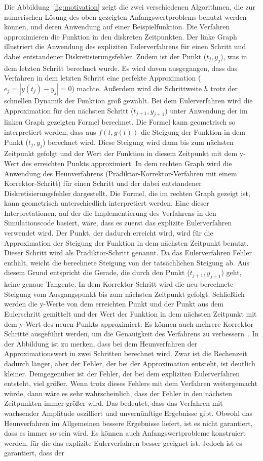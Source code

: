 \documentclass{listhesis}
\begin{document}
Die Abbildung~\ref{fig:motivation} zeigt die zwei verschiedenen Algorithmen, die zur numerischen Lösung des oben gezeigten Anfangswertproblems benutzt werden können, und deren Anwendung auf einer Beispielfunktion. Die Verfahren approximieren die Funktion in den diskreten Zeitpunkten. Der linke Graph illustriert die Anwendung des expliziten Eulerverfahrens für einen Schritt und dabei entstandener Diskretisierungsfehler. Zudem ist der Punkt ($t_j,y_j$), was in dem letzten Schritt berechnet wurde. Es wird davon ausgegangen, dass das Verfahren in dem letzten Schritt eine perfekte Approximation ($e_j = |y(t_j) - y_j| = 0$) machte. Außerdem wird die Schrittweite $h$ trotz der schnellen Dynamik der Funktion groß gewählt. Bei dem Eulerverfahren wird die Approximation für den nächsten Schritt ($t_{j+1}, y_{j+1}$) unter Anwendung der im linken Graph gezeigten Formel berechnet. Die Formel kann geometrisch so interpretiert werden, dass aus $f(t,y(t))$ die Steigung der Funktion in dem Punkt ($t_j, y_j$) berechnet wird. Diese Steigung wird dann bis zum nächsten Zeitpunkt gefolgt und der Wert der Funktion in diesem Zeitpunkt mit dem y-Wert des erreichten Punkts approximiert. In dem rechten Graph wird die Anwendung des Heunverfahrens (Prädiktor-Korrektor-Verfahren mit einem Korrektor-Schritt) für einen Schritt und der dabei entstandener Diskretisierungsfehler dargestellt. Die Formel, die im rechten Graph gezeigt ist, kann geometrisch unterschiedlich interpretiert werden. Eine dieser Interpretationen, auf der die Implementierung des Verfahrens in den Simulationscode basiert, wäre, dass es zuerst das explizite Eulerverfahren verwendet wird. Der Punkt, der dadurch erreicht wird, wird für die Approximation der Steigung der Funktion in dem nächsten Zeitpunkt benutzt. Dieser Schritt wird als Prädiktor-Schritt genannt. Da das Eulerverfahren Fehler enthält, weicht die berechnete Steigung von der tatsächlichen Steigung ab. Aus diesem Grund entspricht die Gerade, die durch den Punkt ($t_{j+1},y_{j+1}$) geht, keine genaue Tangente. In dem Korrektor-Schritt wird die neu berechnete Steigung vom Ausgangspunkt bis zum nächsten Zeitpunkt gefolgt. Schließlich werden die y-Werte von dem erreichten Punkt und der Punkt aus dem Eulerschritt gemittelt und der Wert der Funktion in dem nächsten Zeitpunkt mit dem y-Wert des neuen Punkts approximiert. Es können auch mehrere Korrektor-Schritte ausgeführt werden, um die Genauigkeit des Verfahrens zu verbessern~\cite{butcher}. In der Abbildung ist zu merken, dass bei dem Heunverfahren der Approximationswert in zwei Schritten berechnet wird. Zwar ist die Rechenzeit dadurch länger, aber der Fehler, der bei der Approximation entsteht, ist deutlich kleiner. Demgegenüber ist der Fehler, der bei dem expliziten Eulerverfahren entsteht, viel größer. Wenn trotz dieses Fehlers mit dem Verfahren weitergemacht würde, dann wäre es sehr wahrscheinlich, dass der Fehler in den nächsten Zeitpunkten immer größer wird. Das bedeutet, dass das Verfahren mit wachsender Amplitude oszilliert und unvernünftige Ergebnisse gibt. Obwohl das Heunverfahren im Allgemeinen bessere Ergebnisse liefert, ist es nicht garantiert, dass es immer so sein wird. Es können auch Anfangswertprobleme konstruiert werden, für die das explizite Eulerverfahren besser geeignet ist. Jedoch ist es garantiert, dass der 
\end{document}

